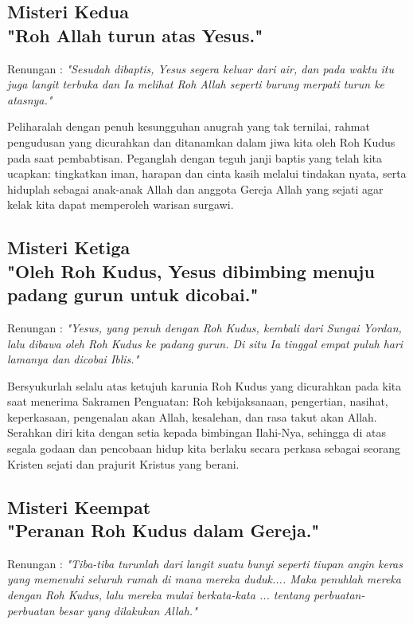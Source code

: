 \documentclass{scrartcl}
\begin{document}
\BSK

\subsection*{Misteri Kedua\\"Roh Allah turun atas Yesus."}
Renungan : \textit{"Sesudah dibaptis, Yesus segera keluar dari air, dan pada waktu itu juga langit terbuka dan Ia melihat Roh Allah seperti burung merpati turun ke atasnya."}

Peliharalah dengan penuh kesungguhan anugrah yang tak ternilai, rahmat pengudusan yang dicurahkan dan ditanamkan dalam jiwa kita oleh Roh Kudus pada saat pembabtisan. Peganglah dengan teguh janji baptis yang telah kita ucapkan: tingkatkan iman, harapan dan cinta kasih melalui tindakan nyata, serta hiduplah sebagai anak-anak Allah dan anggota Gereja Allah yang sejati agar kelak kita dapat memperoleh warisan surgawi.

\BSK 

\subsection*{Misteri Ketiga\\"Oleh Roh Kudus, Yesus dibimbing menuju padang gurun untuk dicobai."}

Renungan : \textit{"Yesus, yang penuh dengan Roh Kudus, kembali dari Sungai Yordan, lalu dibawa oleh Roh Kudus ke padang gurun. Di situ Ia tinggal empat puluh hari lamanya dan dicobai Iblis."}

Bersyukurlah selalu atas ketujuh karunia Roh Kudus yang dicurahkan pada kita saat menerima Sakramen Penguatan: Roh kebijaksanaan, pengertian, nasihat, keperkasaan, pengenalan akan Allah, kesalehan, dan rasa takut akan Allah. Serahkan diri kita dengan setia kepada bimbingan Ilahi-Nya, sehingga di atas segala godaan dan pencobaan hidup kita berlaku secara perkasa sebagai seorang Kristen sejati dan prajurit Kristus yang berani.

\BSK

\subsection*{Misteri Keempat\\"Peranan Roh Kudus dalam Gereja."}

Renungan : \textit{"Tiba-tiba turunlah dari langit suatu bunyi seperti tiupan angin keras yang memenuhi seluruh rumah di mana mereka duduk.... Maka penuhlah mereka dengan Roh Kudus, lalu mereka mulai berkata-kata ... tentang perbuatan-perbuatan besar yang dilakukan Allah."}
\end{document}
